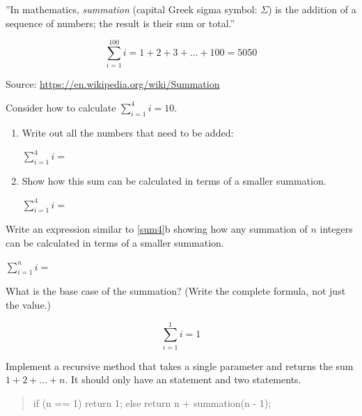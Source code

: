 
''In mathematics, \emph{summation} (capital Greek sigma symbol: $\Sigma$) is the addition of a sequence of numbers; the result is their sum or total.''

$$ \sum_{i=1}^{100} i = 1 + 2 + 3 + \ldots + 100 = 5050 $$

\smallskip\hfill
Source: \url{https://en.wikipedia.org/wiki/Summation}




\Q \label{sum4}
Consider how to calculate $\sum\limits_{i=1}^{4} i = 10$.

\begin{enumerate}
\item Write out all the numbers that need to be added:

$\sum\limits_{i=1}^{4} i =$ 

\item Show how this sum can be calculated in terms of a smaller summation.

$\sum\limits_{i=1}^{4} i =$ 
\end{enumerate}


\Q Write an expression similar to \ref{sum4}b showing how any summation of $n$ integers can be calculated in terms of a smaller summation.

\begin{center}
$\sum\limits_{i=1}^{n} i =$ 
\end{center}


\Q What is the base case of the summation? (Write the complete formula, not just the value.)

\begin{answer}[3em]
$$\sum\limits_{i=1}^{1} i = 1$$
\end{answer}


\Q Implement a recursive method that takes a single parameter  and returns the sum $1 + 2 + \ldots + n$.
It should only have an  statement and two  statements.

\begin{javalst}
public static int summation(int n) {
\end{javalst}
\vspace{-1em}
\begin{quote}
\begin{answer}[6em]
\begin{javaans}
if (n == 1) {
    return 1;
} else {
    return n + summation(n - 1);
}
\end{javaans}
\end{answer}
\end{quote}
\vspace{-1em}
\begin{javalst}
}
\end{javalst}


